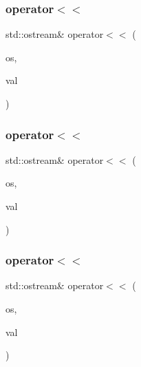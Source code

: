 \subsubsection{\texorpdfstring{operator$<$$<$}{operator<<}\hspace{0.1cm}{\footnotesize\ttfamily [6/9]}}
{\footnotesize\ttfamily std\+::ostream\& operator$<$$<$ (\begin{DoxyParamCaption}\item[{std\+::ostream \&}]{os,  }\item[{const \mbox{\hyperlink{structfakeit_1_1FakeitException}{Fakeit\+Exception}} \&}]{val }\end{DoxyParamCaption})\hspace{0.3cm}{\ttfamily [friend]}}

\mbox{\label{structfakeit_1_1FakeitException_a8321660a372d94f410baf5fee0302fd7}} 
\subsubsection{\texorpdfstring{operator$<$$<$}{operator<<}\hspace{0.1cm}{\footnotesize\ttfamily [7/9]}}
{\footnotesize\ttfamily std\+::ostream\& operator$<$$<$ (\begin{DoxyParamCaption}\item[{std\+::ostream \&}]{os,  }\item[{const \mbox{\hyperlink{structfakeit_1_1FakeitException}{Fakeit\+Exception}} \&}]{val }\end{DoxyParamCaption})\hspace{0.3cm}{\ttfamily [friend]}}

\mbox{\label{structfakeit_1_1FakeitException_a8321660a372d94f410baf5fee0302fd7}} 
\subsubsection{\texorpdfstring{operator$<$$<$}{operator<<}\hspace{0.1cm}{\footnotesize\ttfamily [8/9]}}
{\footnotesize\ttfamily std\+::ostream\& operator$<$$<$ (\begin{DoxyParamCaption}\item[{std\+::ostream \&}]{os,  }\item[{const \mbox{\hyperlink{structfakeit_1_1FakeitException}{Fakeit\+Exception}} \&}]{val }\end{DoxyParamCaption})\hspace{0.3cm}{\ttfamily [friend]}}

